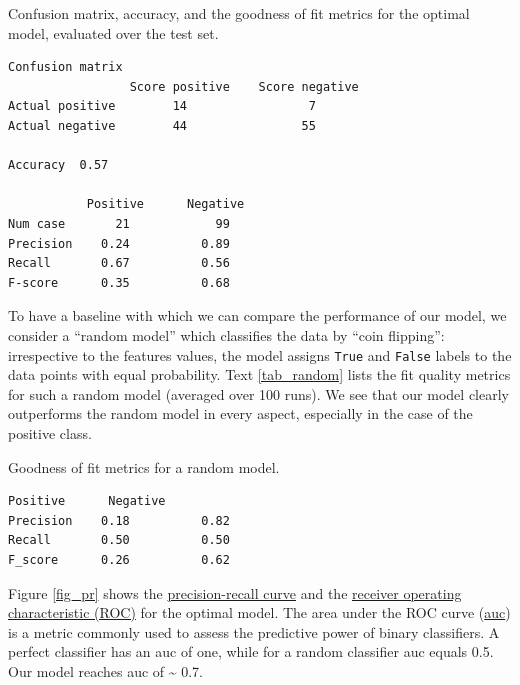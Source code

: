 \documentclass[10pt,parskip=half,
toc=sectionentrywithdots,
bibliography=totocnumbered,
captions=tableheading,numbers=noendperiod]{scrartcl}
\begin{document}
\begin{textcell}[H]
\caption{Confusion matrix, accuracy, and the goodness of fit metrics for the
optimal model, evaluated over the test set.}
\label{tab_confusion}
\begin{lstlisting}[aboveskip=5pt,basicstyle=\small,belowskip=5pt,breakindent=0pt,language={},numbers=none,postbreak={},xrightmargin=7pt]
                 Confusion matrix
                 Score positive    Score negative
Actual positive        14                 7
Actual negative        44                55

Accuracy  0.57

           Positive      Negative
Num case       21            99
Precision    0.24          0.89
Recall       0.67          0.56
F-score      0.35          0.68

\end{lstlisting}\end{textcell}

To have a baseline with which we can compare the performance of our
model, we consider a ``random model'' which classifies the data by
``coin flipping'': irrespective to the features values, the model
assigns \texttt{True} and \texttt{False} labels to the data points with
equal probability. Text \ref{tab_random} lists the fit quality metrics
for such a random model (averaged over 100 runs). We see that our model
clearly outperforms the random model in every aspect, especially in the
case of the positive class.

\begin{textcell}[H]
\caption{Goodness of fit metrics for a random model.}
\label{tab_random}
\begin{lstlisting}[aboveskip=5pt,basicstyle=\small,belowskip=5pt,breakindent=0pt,language={},numbers=none,postbreak={},xrightmargin=7pt]
           Positive      Negative
Precision    0.18          0.82
Recall       0.50          0.50
F_score      0.26          0.62

\end{lstlisting}\end{textcell}

Figure \ref{fig_pr} shows the
\href{https://acutecaretesting.org/en/articles/precision-recall-curves-what-are-they-and-how-are-they-used}{precision-recall
curve} and the
\href{https://en.wikipedia.org/wiki/Receiver_operating_characteristic}{receiver
operating characteristic (ROC)} for the optimal model. The area under
the ROC curve
(\href{https://towardsdatascience.com/understanding-auc-roc-curve-68b2303cc9c5}{auc})
is a metric commonly used to assess the predictive power of binary
classifiers. A perfect classifier has an auc of one, while for a random
classifier auc equals 0.5. Our model reaches auc of \textasciitilde{}
0.7.
\end{document}
